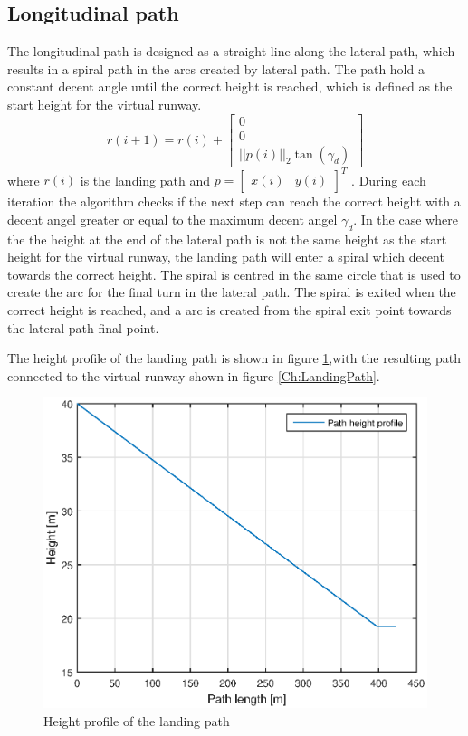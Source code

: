 \subsection{Longitudinal path}
The longitudinal path is designed as a straight line along the lateral path, which results in a spiral path in the arcs created by lateral path. The path hold a constant decent angle until the correct height is reached, which is defined as the start height for the virtual runway.
\begin{equation}
r(i+1) = r(i) +
\begin{bmatrix}
0\\
0\\
||p(i)||_2\tan(\gamma_d)
\end{bmatrix}
\end{equation}
where $r(i)$ is the landing path and 
$p = \begin{bmatrix}
x(i) & y(i)
\end{bmatrix}^T$
. During each iteration the algorithm checks if the next step can reach the correct height with a decent angel greater or equal to the maximum decent angel $\gamma_d$. In the case where the the height at the end of the lateral path is not the same height as the start height for the virtual runway, the landing path will enter a spiral which decent towards the correct height. The spiral is centred in the same circle that is used to create the arc for the final turn in the lateral path. The spiral is exited when the correct height is reached, and a arc is created from the spiral exit point towards the lateral path final point.

The height profile of the landing path is shown in figure \ref{Fig:HeightProfile},with the resulting path connected to the virtual runway shown in figure \ref{Ch:LandingPath}.

\begin{figure}[H]
	\centering
		\includegraphics[width=1\textwidth]{figs/SysPlot/heightProfile.eps}
		\caption{Height profile of the landing path}
		\label{Fig:HeightProfile}
\end{figure}


